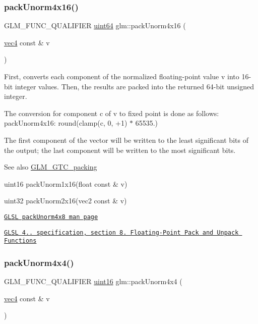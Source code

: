 \subsubsection{\texorpdfstring{pack\+Unorm4x16()}{packUnorm4x16()}}
{\footnotesize\ttfamily G\+L\+M\+\_\+\+F\+U\+N\+C\+\_\+\+Q\+U\+A\+L\+I\+F\+I\+ER \hyperlink{group__gtc__type__precision_gae3632bf9b37da66233d78930dd06378a}{uint64} glm\+::pack\+Unorm4x16 (\begin{DoxyParamCaption}\item[{\hyperlink{group__core__types_ga5881b1b022d7fd1b7218f5916532dd02}{vec4} const \&}]{v }\end{DoxyParamCaption})}

First, converts each component of the normalized floating-\/point value v into 16-\/bit integer values. Then, the results are packed into the returned 64-\/bit unsigned integer.

The conversion for component c of v to fixed point is done as follows\+: pack\+Unorm4x16\+: round(clamp(c, 0, +1) $\ast$ 65535.)

The first component of the vector will be written to the least significant bits of the output; the last component will be written to the most significant bits.

\begin{DoxySeeAlso}{See also}
\hyperlink{group__gtc__packing}{G\+L\+M\+\_\+\+G\+T\+C\+\_\+packing} 

uint16 pack\+Unorm1x16(float const \& v) 

uint32 pack\+Unorm2x16(vec2 const \& v) 

\href{http://www.opengl.org/sdk/docs/manglsl/xhtml/packUnorm4x8.xml}{\tt G\+L\+SL pack\+Unorm4x8 man page} 

\href{http://www.opengl.org/registry/doc/GLSLangSpec.4.20.8.pdf}{\tt G\+L\+SL 4.. specification, section 8. Floating-\/\+Point Pack and Unpack Functions} 
\end{DoxySeeAlso}
\mbox{\label{group__gtc__packing_gad493c9f130e91dd8a4b360b05dcea573}} 
\subsubsection{\texorpdfstring{pack\+Unorm4x4()}{packUnorm4x4()}}
{\footnotesize\ttfamily G\+L\+M\+\_\+\+F\+U\+N\+C\+\_\+\+Q\+U\+A\+L\+I\+F\+I\+ER \hyperlink{group__gtc__type__precision_gad8c2939e1fdd8e5828b31d95c52255d5}{uint16} glm\+::pack\+Unorm4x4 (\begin{DoxyParamCaption}\item[{\hyperlink{group__core__types_ga5881b1b022d7fd1b7218f5916532dd02}{vec4} const \&}]{v }\end{DoxyParamCaption})}

